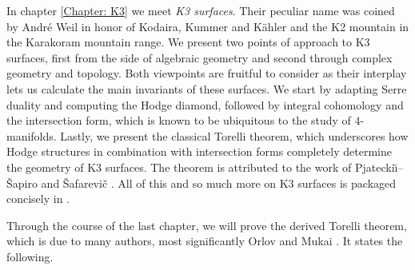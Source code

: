 







In chapter \ref{Chapter: K3} we meet \emph{K3 surfaces}. Their peculiar name was coined by André Weil in honor of Kodaira, Kummer and Kähler and the K2 mountain in the Karakoram mountain range.
We present two points of approach to K3 surfaces, first from the side of algebraic geometry and second through complex geometry and topology. Both viewpoints are fruitful to consider as their interplay lets us calculate the main invariants of these surfaces. We start by adapting Serre duality and computing the Hodge diamond, followed by integral cohomology and the intersection form, which is known to be ubiquitous to the study of $4$-manifolds. Lastly, we present the classical Torelli theorem, which underscores how Hodge structures in combination with intersection forms completely determine the geometry of K3 surfaces. The theorem is attributed to the work of Pjatecki\u{\i}--Šapiro and Šafarevič \cite{PjateckiiShafarevich1971}. All of this and so much more on K3 surfaces is packaged concisely in \cite{Huybrechts2016}. 




Through the course of the last chapter, we will prove the derived Torelli theorem, which is due to many authors, most significantly Orlov \cite{Orlov2003} and Mukai \cite{Mukai1987}.
It states the following.

